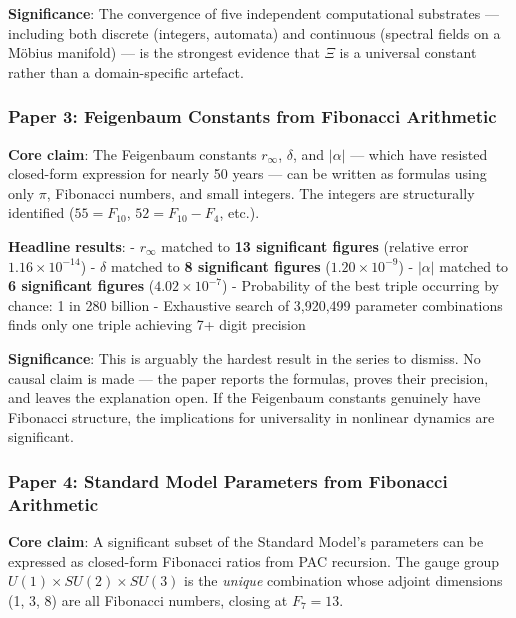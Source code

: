 \documentclass[
  11pt,
  a4paper]{article}
\begin{document}
\textbf{Significance}: The convergence of five independent computational
substrates --- including both discrete (integers, automata) and
continuous (spectral fields on a Möbius manifold) --- is the strongest
evidence that \(\Xi\) is a universal constant rather than a
domain-specific artefact.

\subsubsection{Paper 3: Feigenbaum Constants from Fibonacci
Arithmetic}\label{paper-3-feigenbaum-constants-from-fibonacci-arithmetic}

\textbf{Core claim}: The Feigenbaum constants \(r_\infty\), \(\delta\),
and \(|\alpha|\) --- which have resisted closed-form expression for
nearly 50 years --- can be written as formulas using only \(\pi\),
Fibonacci numbers, and small integers. The integers are structurally
identified (\(55 = F_{10}\), \(52 = F_{10} - F_4\), etc.).

\textbf{Headline results}: - \(r_\infty\) matched to \textbf{13
significant figures} (relative error \(1.16 \times 10^{-14}\)) -
\(\delta\) matched to \textbf{8 significant figures}
(\(1.20 \times 10^{-9}\)) - \(|\alpha|\) matched to \textbf{6
significant figures} (\(4.02 \times 10^{-7}\)) - Probability of the best
triple occurring by chance: 1 in 280 billion - Exhaustive search of
3,920,499 parameter combinations finds only one triple achieving 7+
digit precision

\textbf{Significance}: This is arguably the hardest result in the series
to dismiss. No causal claim is made --- the paper reports the formulas,
proves their precision, and leaves the explanation open. If the
Feigenbaum constants genuinely have Fibonacci structure, the
implications for universality in nonlinear dynamics are significant.

\subsubsection{Paper 4: Standard Model Parameters from Fibonacci
Arithmetic}\label{paper-4-standard-model-parameters-from-fibonacci-arithmetic}

\textbf{Core claim}: A significant subset of the Standard Model's
parameters can be expressed as closed-form Fibonacci ratios from PAC
recursion. The gauge group \(U(1) \times SU(2) \times SU(3)\) is the
\emph{unique} combination whose adjoint dimensions (1, 3, 8) are all
Fibonacci numbers, closing at \(F_7 = 13\).
\end{document}

